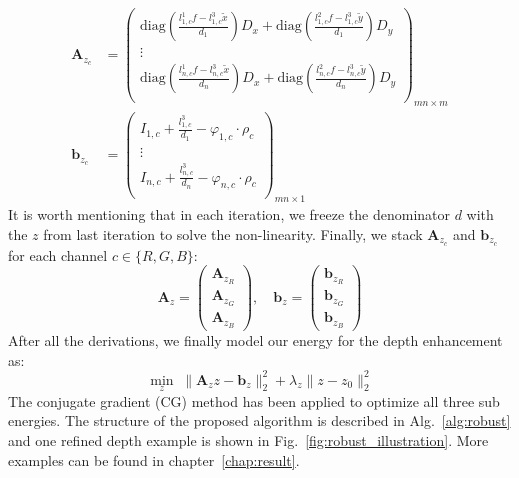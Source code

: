 \begin{equation}\label{eq:robust_depth3}
\begin{split}
    \mathbf{A}_{z_c} &= 
        \begin{pmatrix}    
            \text{diag}(\frac{l^1_{1,c}f - l^3_{1,c}\tilde{x}}{d_1}) D_x + \text{diag}(\frac{l^2_{1,c}f - l^3_{1,c}\tilde{y}}{d_1}) D_y \\
            \vdots \\
            \text{diag}(\frac{l^1_{n,c}f - l^3_{n,c}\tilde{x}}{d_n}) D_x + \text{diag}(\frac{l^2_{n,c}f - l^3_{n,c}\tilde{y}}{d_n}) D_y \\
        \end{pmatrix}_{mn \times m}
\\
    \mathbf{b}_{z_c} &=     
        \begin{pmatrix}    
            I_{1,c} + \frac{l^3_{1,c}}{d_{1}} - \varphi_{1,c} \cdot \rho_{c} \\
            \vdots\\
            I_{n,c} + \frac{l^3_{n,c}}{d_{n}} - \varphi_{n,c} \cdot \rho_{c} \\
        \end{pmatrix}_{mn \times 1}    
\end{split}
\end{equation}
 It is worth mentioning that in each iteration, we freeze the denominator $d$ with the $z$ from last iteration to solve the non-linearity.
 Finally, we stack $\mathbf{A}_{z_c}$ and $\mathbf{b}_{z_c}$ for each channel $c\in\{R,G,B\}$:
 \begin{equation}
     \mathbf{A}_z = 
         \begin{pmatrix}
             \mathbf{A}_{z_R}\\
             \mathbf{A}_{z_G}\\
             \mathbf{A}_{z_B}
         \end{pmatrix},\quad
     \mathbf{b}_z = 
         \begin{pmatrix}
             \mathbf{b}_{z_R}\\
             \mathbf{b}_{z_G}\\
             \mathbf{b}_{z_B}
         \end{pmatrix}         
 \end{equation}
After all the derivations, we finally model our energy for the depth enhancement as:
 \begin{equation}\label{eq:robust_depth_estimate}
    \min_{z} \; \lVert  \mathbf{A}_{z}z - \mathbf{b}_z\rVert^2_2 + \lambda_{z}\lVert z - z_0 \rVert_2^2
\end{equation}
The conjugate gradient (CG) method has been applied to optimize all three sub energies.
The structure of the proposed algorithm is described in Alg.~\ref{alg:robust} and one refined depth example is shown in Fig.~\ref{fig:robust_illustration}.
More examples can be found in chapter~\ref{chap:result}.

